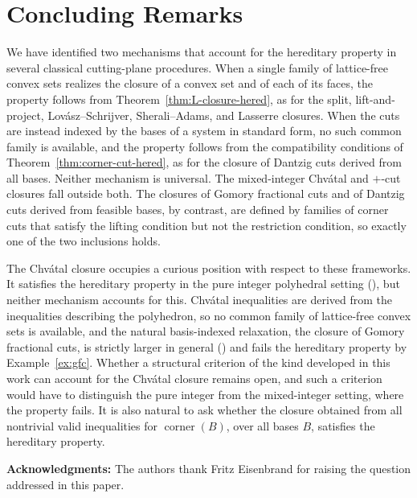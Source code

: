 \documentclass{article}
\newtheorem{theorem}{Theorem}
\newcommand{\R}{\mathbb{R}}
\begin{document}


\section{Concluding Remarks} \label{sec:conclusion}

We have identified two mechanisms that account for the hereditary property in several classical cutting-plane procedures. When a single family of lattice-free convex sets realizes the closure of a convex set and of each of its faces, the property follows from Theorem~\ref{thm:L-closure-hered}, as for the split, lift-and-project, Lov\'asz--Schrijver, Sherali--Adams, and Lasserre closures. When the cuts are instead indexed by the bases of a system in standard form, no such common family is available, and the property follows from the compatibility conditions of Theorem~\ref{thm:corner-cut-hered}, as for the closure of Dantzig cuts derived from all bases. Neither mechanism is universal. The mixed-integer Chv\'atal and $+$-cut closures fall outside both. The closures of Gomory fractional cuts and of Dantzig cuts derived from feasible bases, by contrast, are defined by families of corner cuts that satisfy the lifting condition but not the restriction condition, so exactly one of the two inclusions holds.

The Chv\'atal closure occupies a curious position with respect to these frameworks. It satisfies the hereditary property in the pure integer polyhedral setting (\cite{schrijver1980cutting}), but neither mechanism accounts for this. Chv\'atal inequalities are derived from the inequalities describing the polyhedron, so no common family of lattice-free convex sets is available, and the natural basis-indexed relaxation, the closure of Gomory fractional cuts, is strictly larger in general (\cite{cornuejols2001elementary}) and fails the hereditary property by Example~\ref{ex:gfc}. Whether a structural criterion of the kind developed in this work can account for the Chv\'atal closure remains open, and such a criterion would have to distinguish the pure integer from the mixed-integer setting, where the property fails. It is also natural to ask whether the closure obtained from all nontrivial valid inequalities for $\operatorname{corner}(B)$, over all bases $B$, satisfies the hereditary property.

\bigskip
{\bf Acknowledgments:} The authors thank Fritz Eisenbrand for raising the question addressed in this paper.



\end{document}
